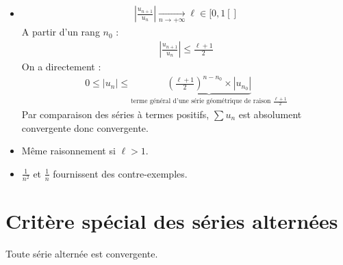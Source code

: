\documentclass[../main.tex]{subfiles}
\begin{document}
\begin{itemize}
    \item \begin{align*}
        \left| \frac{u_{n+1}}{u_n} \right| \underset{n \to +\infty}{\longrightarrow} \ell\in [0, 1[]
    \end{align*}
    A partir d'un rang $n_0$ : 
    \begin{align*}
        \left| \frac{u_{n+1}}{u_n} \right| \leq \frac{\ell + 1}{2}
    \end{align*}
    On a directement : 
    \begin{align*}
        0 \leq |u_n| \leq \underbrace{\left( \frac{\ell + 1}{2} \right)^{n - n_0} \times |u_{n_0}|}_{\text{terme général d'une série géométrique de raison $\frac{\ell + 1}{2}$}}
    \end{align*}
    Par comparaison des séries à termes positifs, $\sum u_n$ est absolument convergente donc convergente. 
    \item Même raisonnement si $\ell > 1$. 
    \item $\frac{1}{n^2}$ et $\frac{1}{n}$ fournissent des contre-exemples. 
\end{itemize}

\section{Critère spécial des séries alternées}
\begin{tcolorbox}[title=Théorème 27.39, title filled=false, colframe=orange, colback=orange!10!white]
    Toute série alternée est convergente. 
\end{tcolorbox}
\end{document}
